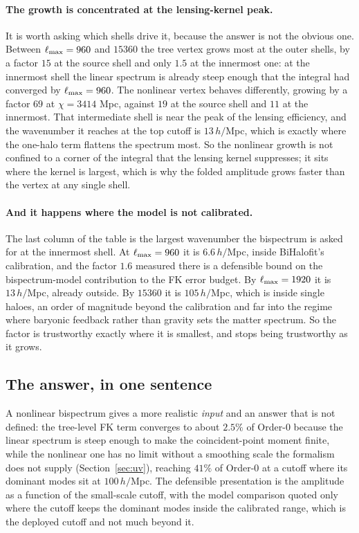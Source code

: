 \paragraph{The growth is concentrated at the lensing-kernel peak.} It is
worth asking which shells drive it, because the answer is not the obvious
one. Between $\ell_{\max}=960$ and $15360$ the tree vertex grows most at the
outer shells, by a factor $15$ at the source shell and only $1.5$ at the
innermost one: at the innermost shell the linear spectrum is already steep
enough that the integral had converged by $\ell_{\max}=960$. The nonlinear
vertex behaves differently, growing by a factor $69$ at
$\chi=3414$ Mpc, against $19$ at the source shell and $11$ at the
innermost. That intermediate shell is near the peak of the lensing
efficiency, and the wavenumber it reaches at the top cutoff is
$13\,h/$Mpc, which is exactly where the one-halo term flattens the spectrum
most. So the nonlinear growth is not confined to a corner of the integral
that the lensing kernel suppresses; it sits where the kernel is largest,
which is why the folded amplitude grows faster than the vertex at any
single shell.

\paragraph{And it happens where the model is not calibrated.} The last
column of the table is the largest wavenumber the bispectrum is asked for
at the innermost shell. At $\ell_{\max}=960$ it is $6.6\,h/$Mpc, inside
BiHalofit's calibration, and the factor $1.6$ measured there is a
defensible bound on the bispectrum-model contribution to the FK error
budget. By $\ell_{\max}=1920$ it is $13\,h/$Mpc, already outside. By $15360$ it
is $105\,h/$Mpc, which is inside single haloes, an order of magnitude
beyond the calibration and far into the regime where baryonic feedback
rather than gravity sets the matter spectrum. So the factor is trustworthy
exactly where it is smallest, and stops being trustworthy as it grows.

\subsection{The answer, in one sentence}

A nonlinear bispectrum gives a more realistic \emph{input} and an answer
that is not defined: the tree-level FK term converges to about $2.5\%$ of
Order-0 because the linear spectrum is steep enough to make the
coincident-point moment finite, while the nonlinear one has no limit
without a smoothing scale the formalism does not supply
(Section~\ref{sec:uv}), reaching $41\%$ of Order-0 at a cutoff where its
dominant modes sit at $100\,h/$Mpc. The defensible presentation is the
amplitude as a function of the small-scale cutoff, with the model
comparison quoted only where the cutoff keeps the dominant modes inside the
calibrated range, which is the deployed cutoff and not much beyond it.

